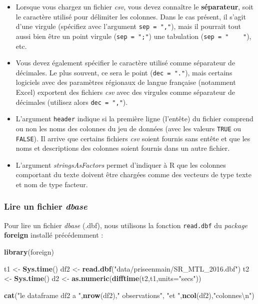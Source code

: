 \documentclass[
  11pt,
  french,
]{book}
\makeatletter
\newenvironment{Shaded}{\begin{snugshade}}{\end{snugshade}}
\newcommand{\CharTok}[1]{\textcolor[rgb]{0.31,0.60,0.02}{#1}}
\newcommand{\DataTypeTok}[1]{\textcolor[rgb]{0.13,0.29,0.53}{#1}}
\newcommand{\KeywordTok}[1]{\textcolor[rgb]{0.13,0.29,0.53}{\textbf{#1}}}
\newcommand{\NormalTok}[1]{#1}
\newcommand{\StringTok}[1]{\textcolor[rgb]{0.31,0.60,0.02}{#1}}
\providecommand{\tightlist}{%
  \setlength{\itemsep}{0pt}\setlength{\parskip}{0pt}}
\newenvironment{kframe}{%
\medskip{}
\setlength{\fboxsep}{.8em}
 \def\at@end@of@kframe{}%
 \ifinner\ifhmode%
  \def\at@end@of@kframe{\end{minipage}}%
  \begin{minipage}{\columnwidth}%
 \fi\fi%
 \def\FrameCommand##1{\hskip\@totalleftmargin \hskip-\fboxsep
 \colorbox{shadecolor}{##1}\hskip-\fboxsep
     \hskip-\linewidth \hskip-\@totalleftmargin \hskip\columnwidth}%
 \MakeFramed {\advance\hsize-\width
   \@totalleftmargin\z@ \linewidth\hsize
   \@setminipage}}%
 {\par\unskip\endMakeFramed%
 \at@end@of@kframe}
\renewenvironment{Shaded}{\begin{kframe}}{\end{kframe}}
\makeatother
\begin{document}
\begin{itemize}
\tightlist
\item
  Lorsque vous chargez un fichier \emph{csv}, vous devez connaître le \textbf{séparateur}, soit le caractère utilisé pour délimiter les colonnes. Dans le cas présent, il s'agit d'une virgule (spécifiez avec l'argument \texttt{sep\ =\ ","}), mais il pourrait tout aussi bien être un point virgule (\texttt{sep\ =\ ";"}) une tabulation (\texttt{sep\ =\ "\ \ \ \ "}), etc.
\item
  Vous devez également spécifier le caractère utilisé comme séparateur de décimales. Le plus souvent, ce sera le point (\texttt{dec\ =\ "."}), mais certains logiciels avec des paramètres régionaux de langue française (notamment Excel) exportent des fichiers \emph{csv} avec des virgules comme séparateur de décimales (utilisez alors \texttt{dec\ =\ ","}).
\item
  L'argument \texttt{header} indique si la première ligne (l'entête) du fichier comprend ou non les noms des colonnes du jeu de données (avec les valeurs \texttt{TRUE} ou \texttt{FALSE}). Il arrive que certains fichiers \emph{csv} soient fournis sans entête et que les noms et descriptions des colonnes soient fournis dans un autre fichier.
\item
  L'argument \emph{stringsAsFactors} permet d'indiquer à R que les colonnes comportant du texte doivent être chargées comme des vecteurs de type texte et nom de type facteur.
\end{itemize}

\hypertarget{sect01412}{%
\subsubsection{\texorpdfstring{Lire un fichier \emph{dbase}}{Lire un fichier dbase}}\label{sect01412}}

Pour lire un fichier \emph{dbase} (.dbf), nous utilisons la fonction \texttt{read.dbf} du \emph{package} \textbf{foreign} installé précédemment :

\begin{Shaded}
\begin{Highlighting}[]
\KeywordTok{library}\NormalTok{(foreign)}

\NormalTok{t1 <-}\StringTok{ }\KeywordTok{Sys.time}\NormalTok{()}
\NormalTok{df2 <-}\StringTok{ }\KeywordTok{read.dbf}\NormalTok{(}\StringTok{"data/priseenmain/SR_MTL_2016.dbf"}\NormalTok{)}
\NormalTok{t2 <-}\StringTok{ }\KeywordTok{Sys.time}\NormalTok{()}
\NormalTok{d2 <-}\StringTok{ }\KeywordTok{as.numeric}\NormalTok{(}\KeywordTok{difftime}\NormalTok{(t2,t1,}\DataTypeTok{units=}\StringTok{"secs"}\NormalTok{))}

\KeywordTok{cat}\NormalTok{(}\StringTok{"le dataframe df2 a "}\NormalTok{,}\KeywordTok{nrow}\NormalTok{(df2),}\StringTok{" observations"}\NormalTok{,}
    \StringTok{"et "}\NormalTok{,}\KeywordTok{ncol}\NormalTok{(df2),}\StringTok{"colonnes}\CharTok{\textbackslash{}n}\StringTok{"}\NormalTok{)}
\end{Highlighting}
\end{Shaded}
\end{document}
